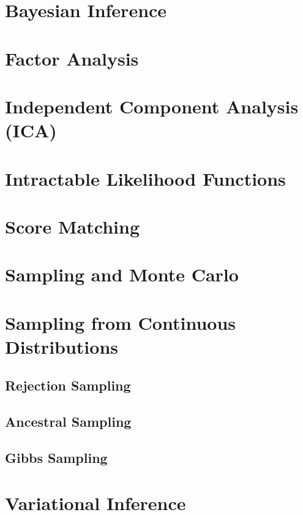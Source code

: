 \documentclass{article}
\begin{document}
\section{Bayesian Inference}
\section{Factor Analysis}
\section{Independent Component Analysis (ICA)}

\section{Intractable Likelihood Functions}
\section{Score Matching}
\section{Sampling and Monte Carlo}

\section{Sampling from Continuous Distributions}
\subsection{Rejection Sampling}
\subsection{Ancestral Sampling}
\subsection{Gibbs Sampling}

\section{Variational Inference}


\end{document}
